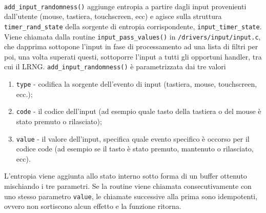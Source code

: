 \documentclass{article}
\begin{document}
 \paragraph{} \verb+add_input_randomness()+ aggiunge entropia a partire dagli
 input provenienti dall'utente (mouse, tastiera, touchscreen, ecc) e agisce
 sulla struttura \verb+timer_rand_state+ della sorgente di
 entropia corrispondente, \verb+input_timer_state+. Viene chiamata dalla routine
 \verb+input_pass_values()+ in \verb+/drivers/input/input.c+, che dapprima
 sottopone l'input in fase di processamento ad una lista di filtri per poi, una
 volta superati questi, sottoporre l'input a tutti gli opportuni
 handler, tra cui il LRNG.
 \newline{}\verb+add_input_randomness()+ è parametrizzata dai tre valori
 \begin{enumerate}
   \item \verb+type+ - codifica la sorgente dell'evento di input (tastiera,
   mouse, touchscreen, ecc.);
   \item \verb+code+ - il codice dell'input (ad esempio quale tasto della
   tastiera o del mouse è stato premuto o rilasciato);
   \item \verb+value+ - il valore dell'input, specifica quale evento specifico è
   occorso per il codice code (ad esempio se il tasto è stato premuto,
   mantenuto o rilasciato, ecc).
   \end{enumerate} 
 L'entropia viene aggiunta allo stato interno sotto forma di un buffer
 ottenuto mischiando i tre parametri.
 Se la routine viene chiamata consecutivamente con uno stesso parametro
 \verb+value+, le chiamate successive alla prima sono idempotenti, 
 ovvero non sortiscono alcun effetto e la funzione ritorna.
 
\end{document}
